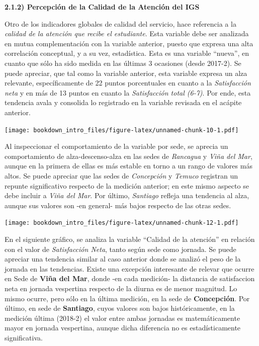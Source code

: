 \documentclass[]{book}
\begin{document}
\textbf{2.1.2) Percepción de la Calidad de la Atención del IGS}

Otro de los indicadores globales de calidad del servicio, hace
referencia a la \emph{calidad de la atención que recibe el estudiante}.
Esta variable debe ser analizada en mutua complementación con la
variable anterior, puesto que expresa una alta correlación conceptual, y
a su vez, estadística. Esta es una variable ``nueva'', en cuanto que
sólo ha sido medida en las últimas 3 ocasiones (desde 2017-2). Se puede
apreciar, que tal como la variable anterior, esta variable expresa un
alza relevante, específicamente de 22 puntos porcentuales en cuanto a la
\emph{Satisfacción neta} y en más de 13 puntos en cuanto la
\emph{Satisfacción total (6-7)}. Por ende, esta tendencia avala y
consolida lo registrado en la variable revisada en el acápite anterior.

\texttt{[image: bookdown\_intro\_files/figure-latex/unnamed-chunk-10-1.pdf]}

Al inspeccionar el comportamiento de la variable por sede, se aprecia un
comportamiento de alza-descenso-alza en las sedes de \emph{Rancagua} y
\emph{Viña del Mar}, aunque en la primera de ellas es más estable en
torno a un rango de valores más altos. Se puede apreciar que las sedes
de \emph{Concepción} y \emph{Temuco} registran un repunte significativo
respecto de la medición anterior; en este mismo aspecto se debe incluir
a \emph{Viña del Mar}. Por último, \emph{Santiago} refleja una tendencia
al alza, aunque sus valores son -en general- más bajos respecto de las
otras sedes.

\texttt{[image: bookdown\_intro\_files/figure-latex/unnamed-chunk-12-1.pdf]}

En el siguiente gráfico, se analiza la variable ``Calidad de la
atención'' en relación con el valor de \emph{Satisfacción Neta}, tanto
según sede como jornada. Se puede apreciar una tendencia similar al caso
anterior donde se analizó el peso de la jornada en las tendencias.
Existe una excepción interesante de relevar que ocurre en Sede de
\textbf{Viña del Mar}, donde -en cada medición- la distancia de
satisfaccion neta en jornada vespertina respecto de la diurna es de
menor magnitud. Lo mismo ocurre, pero sólo en la última medición, en la
sede de \textbf{Concepción}. Por último, en sede de \textbf{Santiago},
cuyos valores son bajos históricamente, en la medición última (2018-2)
el valor entre ambas jornadas es matemáticamente mayor en jornada
vespertina, aunque dicha diferencia no es estadísticamente
significativa.
\end{document}

